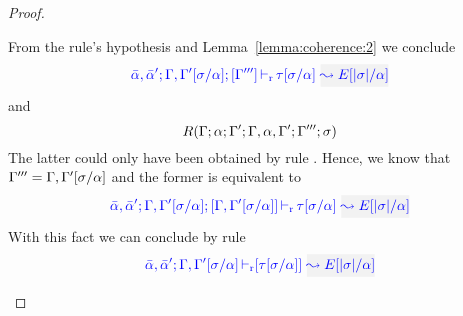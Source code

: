 \begin{proof}
\begin{description}
From the rule's hypothesis and Lemma~\ref{lemma:coherence:2} we conclude
\begin{equation*}
\dlres{\bar{\alpha},\bar{\alpha}'}{\tenv,\tenv'[\suty/\alpha]}{\tenv'''}{\type[\suty/\alpha]}{E[|\suty|/\alpha]}
\end{equation*}
  and
\begin{equation*}
  R(\Gamma;\alpha;\Gamma';\Gamma,\alpha,\Gamma';\Gamma''';\sigma)
\end{equation*}
  The latter could only have been obtained by rule . 
  Hence, we know that $\Gamma''' = \Gamma,\Gamma'[\sigma/\alpha]$ and the former is equivalent to
\begin{equation*}
\dlres{\bar{\alpha},\bar{\alpha}'}{\tenv,\tenv'[\suty/\alpha]}{\tenv,\tenv'[\suty/\alpha]}{\type[\suty/\alpha]}{E[|\suty|/\alpha]}
\end{equation*}
With this fact we can conclude by rule 
\begin{equation*}
\drres{\bar{\alpha},\bar{\alpha}'}{\tenv,\tenv'[\suty/\alpha]}{\type[\suty/\alpha]}{E[|\suty|/\alpha]}
\end{equation*}
\end{description}
\end{proof}

{\centering
{}}

